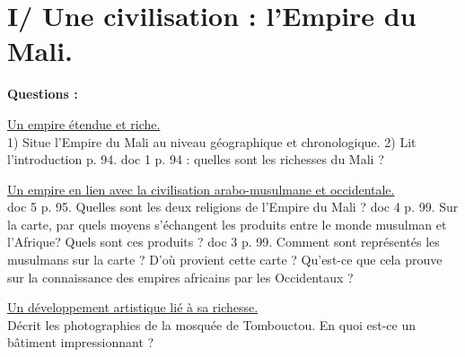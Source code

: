 \documentclass{beamer}
\begin{document}
\section{I/ Une civilisation : l'Empire du Mali.}

\begin{frame}
\textbf{Questions : }

\underline{Un empire étendue et riche.}\\
1) Situe l'Empire du Mali au niveau géographique et chronologique.
2) Lit l'introduction p. 94.
doc 1 p. 94 : quelles sont les richesses du Mali ?

\underline{Un empire en lien avec la civilisation arabo-musulmane et occidentale.}\\
doc 5 p. 95. Quelles sont les deux religions de l'Empire du Mali ?
doc 4 p. 99. Sur la carte, par quels moyens s'échangent les produits entre le monde musulman et l'Afrique? Quels sont ces produits ?
doc 3 p. 99. Comment sont représentés les musulmans sur la carte ? D'où provient cette carte ? Qu'est-ce que cela prouve sur la connaissance des empires africains par les Occidentaux ?

\underline{Un développement artistique lié à sa richesse.}\\
Décrit les photographies de la mosquée de Tombouctou. En quoi est-ce un bâtiment impressionnant ?
\end{frame}
\end{document}
